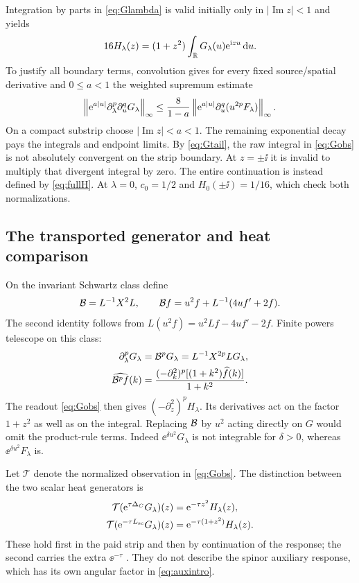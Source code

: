 Integration by parts in \eqref{eq:Glambda} is valid initially only in
$|\operatorname{Im}z|<1$ and yields
\begin{equation}\label{eq:Gobs}
 16H_\lambda(z)=(1+z^2)\int_\mathbb R G_\lambda(u)\mathrm e^{\mathrm i zu}\,\mathrm d u.
\end{equation}
To justify all boundary terms, convolution gives for every fixed
source/spatial derivative and $0\le a<1$ the weighted supremum estimate
\[
 \left\lVert\mathrm e^{a|u|}\partial_\lambda^p\partial_u^qG_\lambda\right\rVert_\infty
 \le\frac{8}{1-a}
 \left\lVert\mathrm e^{a|u|}\partial_u^q(u^{2p}F_\lambda)\right\rVert_\infty.
\]
On a compact substrip choose $|\operatorname{Im}z|<a<1$.
The remaining exponential decay pays the integrals and endpoint limits.
By \eqref{eq:Gtail}, the raw integral in \eqref{eq:Gobs} is not absolutely
convergent on the strip boundary. At $z=\pm\ii$ it is invalid to multiply
that divergent integral by zero. The entire continuation is instead
defined by \eqref{eq:fullH}. At $\lambda=0$, $c_0=1/2$ and
$H_0(\pm\ii)=1/16$, which check both normalizations.

\subsection{The transported generator and heat comparison}
On the invariant Schwartz class define
\begin{equation}\label{eq:transport}
 \mathcal B=L^{-1}X^2L,\qquad
 \mathcal B f=u^2f+L^{-1}(4uf'+2f).
\end{equation}
The second identity follows from
$L(u^2f)=u^2Lf-4uf'-2f$. Finite powers telescope on this class:
\begin{align}
 \partial_\lambda^pG_\lambda
 &=\mathcal B^pG_\lambda=L^{-1}X^{2p}LG_\lambda,\label{eq:Bpower}\\
 \widehat{\mathcal B^pf}(k)
 &=\frac{(-\partial_k^2)^p[(1+k^2)\widehat f(k)]}{1+k^2}.
\end{align}
The readout \eqref{eq:Gobs} then gives
$(-\partial_z^2)^pH_\lambda$. Its derivatives act on the factor
$1+z^2$ as well as on the integral. Replacing $\mathcal B$ by $u^2$ acting
directly on $G$ would omit the product-rule terms. Indeed
$\ee^{\delta u^2}G_\lambda$ is not integrable for $\delta>0$,
whereas $\ee^{\delta u^2}F_\lambda$ is.

Let $\mathcal T$ denote the normalized observation in \eqref{eq:Gobs}.
The distinction between the two scalar heat generators is
\begin{equation}\label{eq:heatcompare}
 \begin{aligned}
 \mathcal T(\mathrm e^{\tau\Delta_C}G_\lambda)(z)
   &=\mathrm e^{-\tau z^2}H_\lambda(z),\\
 \mathcal T(\mathrm e^{-\tau L_{\mathrm{sc}}}G_\lambda)(z)
   &=\mathrm e^{-\tau(1+z^2)}H_\lambda(z).
 \end{aligned}
\end{equation}
These hold first in the paid strip and then by continuation of the
response; the second carries the extra $\ee^{-\tau}$
\cite[Section 5]{TNDSharedReview}. They do not describe the spinor
auxiliary response, which has its own angular factor in
\eqref{eq:auxintro}.

